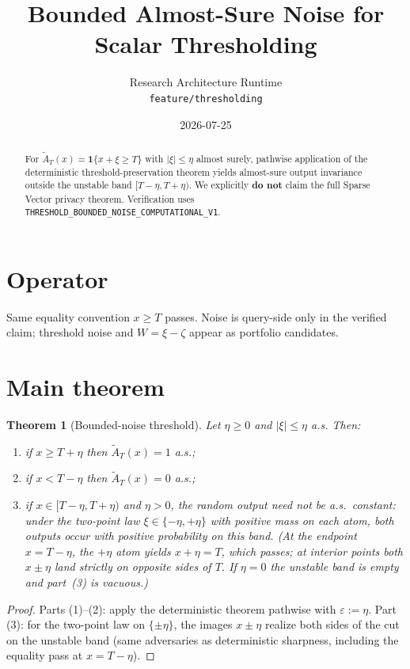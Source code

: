 \documentclass[11pt]{article}
\title{Bounded Almost-Sure Noise for Scalar Thresholding}
\author{Research Architecture Runtime \\ \texttt{feature/thresholding}}
\date{2026-07-25}
\newtheorem{theorem}{Theorem}
\begin{document}
\maketitle

\begin{abstract}
For \(\widetilde A_T(x)=\mathbf{1}\{x+\xi\ge T\}\) with
\(\lvert\xi\rvert\le\eta\) almost surely, pathwise application of the
deterministic threshold-preservation theorem yields almost-sure output
invariance outside the unstable band \([T-\eta,T+\eta)\).
We explicitly \textbf{do not} claim the full Sparse Vector privacy theorem.
Verification uses \texttt{THRESHOLD\_BOUNDED\_NOISE\_COMPUTATIONAL\_V1}.
\end{abstract}

\section{Operator}
Same equality convention \(x\ge T\) passes.
Noise is query-side only in the verified claim; threshold noise and
\(W=\xi-\zeta\) appear as portfolio candidates.

\section{Main theorem}
\begin{theorem}[Bounded-noise threshold]\label{thm:noisy}
Let \(\eta\ge 0\) and \(\lvert\xi\rvert\le\eta\) a.s. Then:
\begin{enumerate}
\item if \(x\ge T+\eta\) then \(\widetilde A_T(x)=1\) a.s.;
\item if \(x<T-\eta\) then \(\widetilde A_T(x)=0\) a.s.;
\item if \(x\in[T-\eta,T+\eta)\) and \(\eta>0\), the random output need not be a.s.\ constant:
under the two-point law \(\xi\in\{-\eta,+\eta\}\) with positive mass on each atom,
both outputs occur with positive probability on this band.
(At the endpoint \(x=T-\eta\), the \(+\eta\) atom yields \(x+\eta=T\), which passes;
at interior points both \(x\pm\eta\) land strictly on opposite sides of \(T\).
If \(\eta=0\) the unstable band is empty and part~(3) is vacuous.)
\end{enumerate}
\end{theorem}

\begin{proof}
Parts (1)--(2): apply the deterministic theorem pathwise with \(\varepsilon:=\eta\).
Part (3): for the two-point law on \(\{\pm\eta\}\), the images \(x\pm\eta\) realize
both sides of the cut on the unstable band (same adversaries as deterministic
sharpness, including the equality pass at \(x=T-\eta\)).
\end{proof}
\end{document}

